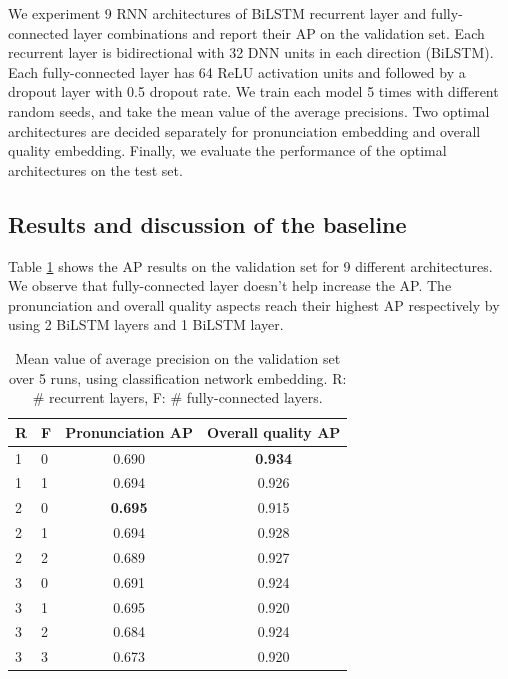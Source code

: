We experiment 9 \gls{RNN} architectures of \gls{BiLSTM} recurrent layer and fully-connected layer combinations and report their \gls{AP} on the validation set. Each recurrent layer is bidirectional with 32 \gls{DNN} units in each direction (\gls{BiLSTM}). Each fully-connected layer has 64 \gls{ReLU} activation units and followed by a dropout layer with 0.5 dropout rate. We train each model 5 times with different random seeds, and take the mean value of the average precisions. Two optimal architectures are decided separately for pronunciation embedding and overall quality embedding. Finally, we evaluate the performance of the optimal architectures on the test set.

\subsection{Results and discussion of the baseline}\label{sec:ch7:baseline_results_classification}

Table \ref{tab:ch7:validation_classification} shows the \gls{AP} results on the validation set for 9 different architectures. We observe that fully-connected layer doesn't help increase the \gls{AP}. The pronunciation and overall quality aspects reach their highest \gls{AP} respectively by using 2 \gls{BiLSTM} layers and 1 \gls{BiLSTM} layer. 

\begin{table}[ht!]
\centering
\caption{Mean value of average precision on the validation set over 5 runs, using classification network embedding. R: \# recurrent layers, F: \# fully-connected layers.}
\label{tab:ch7:validation_classification}
\begin{tabular}{llcc}
\toprule
R & F & Pronunciation AP & Overall quality AP \\
\midrule
1 & 0 & 0.690            & \textbf{0.934}     \\
1 & 1 & 0.694            & 0.926              \\
2 & 0 & \textbf{0.695}   & 0.915              \\
2 & 1 & 0.694            & 0.928              \\
2 & 2 & 0.689            & 0.927              \\
3 & 0 & 0.691            & 0.924              \\
3 & 1 & 0.695            & 0.920              \\
3 & 2 & 0.684            & 0.924              \\
3 & 3 & 0.673            & 0.920             \\
\bottomrule
\end{tabular}
\end{table}

